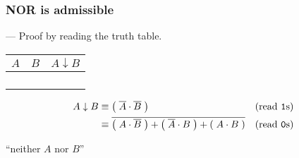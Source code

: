 \begin{frame}

\frametitle{NOR is admissible}

\begin{flushright}
--- Proof by reading the truth table.
\end{flushright}

\begin{center}

\begin{tabular}{cc|>{\centering\arraybackslash}p{0.4in}}
$A$ & $B$ & $A \downarrow B$ \\\hline
\bz{} & \bz{} & \bo{} \\
\bz{} & \bo{} & \bz{} \\
\bo{} & \bz{} & \bz{} \\
\bo{} & \bo{} & \bz{}
\end{tabular}

\begin{minipage}[t][0.9in]{\textwidth}
\begin{align*}
A \downarrow B %
&\equiv \p{\overline{A} \cdot \overline{B}} & \text{(read \texttt{1}s)}\\
&\equiv \overline{\p{A \cdot \overline{B}} + \p{\overline{A} \cdot B} + \p{A \cdot B}}%
& \text{(read \texttt{0}s)}
\end{align*}
\end{minipage}

``neither $A$ nor $B$''

\end{center}

\end{frame}

